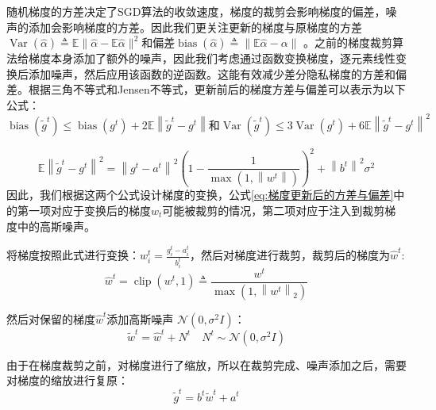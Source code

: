 随机梯度的方差决定了SGD算法的收敛速度，梯度的裁剪会影响梯度的偏差，噪声的添加会影响梯度的方差。因此我们更关注更新的梯度与原梯度的方差$\operatorname{Var}(\hat{\alpha}) \triangleq \mathbb{E}\|\hat{\alpha}-\mathbb{E} \hat{\alpha}\|^{2}$和偏差$\operatorname{bias}(\hat{\alpha}) \triangleq\|\mathbb{E} \hat{\alpha}-\alpha\|$ 。之前的梯度裁剪算法给梯度本身添加了额外的噪声，因此我们考虑通过函数变换梯度，逐元素线性变换后添加噪声，然后应用该函数的逆函数。这能有效减少差分隐私梯度的方差和偏差。根据三角不等式和Jensen不等式，更新前后的梯度方差与偏差可以表示为以下公式：
\begin{equation}\label{eq:梯度更新后的方差与偏差}
\operatorname{bias}\left(\tilde{g}^{t}\right) \leq \operatorname{bias}\left(g^{t}\right)+2 \mathbb{E}\left\|\tilde{g}^{t}-g^{t}\right\| \text {和} \operatorname{Var}\left(\tilde{g}^{t}\right) \leq 3 \operatorname{Var}\left(g^{t}\right)+6 \mathbb{E}\left\|\tilde{g}^{t}-g^{t}\right\|^{2}
\end{equation}

\begin{equation}
\mathbb{E}\left\|\tilde{g}^{t}-g^{t}\right\|^{2}=\left\|g^{t}-a^{t}\right\|^{2}\left(1-\frac{1}{\max \left(1,\left\|w^{t}\right\|\right)}\right)^{2}+\left\|b^{t}\right\|^{2} \sigma^{2}
\end{equation}
因此，我们根据这两个公式设计梯度的变换，公式\ref{eq:梯度更新后的方差与偏差}中的第一项对应于变换后的梯度$w_{t}$可能被裁剪的情况，第二项对应于注入到裁剪梯度中的高斯噪声。

将梯度按照此式进行变换：$w_{i}^{t}=\frac{g_{i}^{t}-a_{i}^{t}}{b_{i}^{t}}$，然后对梯度进行裁剪，裁剪后的梯度为$\hat{w}^{t}$:
\begin{equation}
\hat{w}^{t}=\operatorname{clip}\left(w^{t}, 1\right) \triangleq \frac{w^{t}}{\max \left(1,\left\|w^{t}\right\|_{2}\right)}
\end{equation}

然后对保留的梯度$\hat{w}^{t}$添加高斯噪声 $\mathcal{N}\left(0, \sigma^{2} I\right)$：
\begin{equation}
\tilde{w}^{t}=\hat{w}^{t}+N^{t} \quad N^{t} \sim \mathcal{N}\left(0, \sigma^{2} I\right)
\end{equation}

由于在梯度裁剪之前，对梯度进行了缩放，所以在裁剪完成、噪声添加之后，需要对梯度的缩放进行复原：
\begin{equation}
\tilde{g}^{t}=b^{t} \tilde{w}^{t}+a^{t}
\end{equation}

